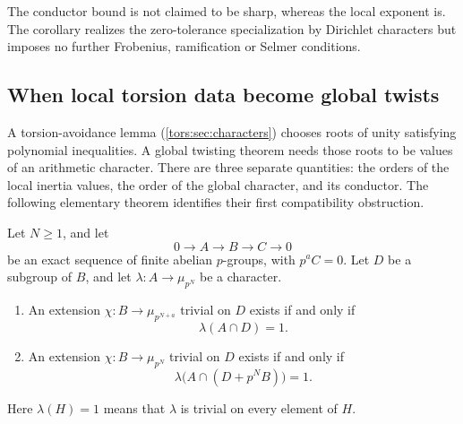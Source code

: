 The conductor bound is not claimed to be sharp, whereas the local exponent is. The
corollary realizes the zero-tolerance specialization by Dirichlet characters but imposes no
further Frobenius, ramification or Selmer conditions.

\subsection{When local torsion data become global twists}\label{spn:sec:characters}

A torsion-avoidance lemma (\cref{tors:sec:characters}) chooses roots of unity satisfying
polynomial inequalities. A global twisting theorem needs those roots to be
values of an arithmetic character. There are three separate quantities: the
orders of the local inertia values, the order of the global character, and
its conductor. The following elementary theorem identifies their first
compatibility obstruction.

\begin{theorem}\label{spn:thm:extension}
Let $N\ge1$, and let
\[
 0\longrightarrow A\longrightarrow B\longrightarrow C\longrightarrow0
\]
be an exact sequence of finite abelian $p$-groups, with $p^aC=0$. Let $D$ be
a subgroup of $B$, and let $\lambda\colon A\to\mu_{p^N}$ be a character.
\begin{enumerate}
\item An extension $\chi\colon B\to\mu_{p^{N+a}}$ trivial on $D$ exists if
and only if
\begin{equation}\label{spn:eq:compat-raised}
 \lambda(A\cap D)=1 .
\end{equation}
\item An extension $\chi\colon B\to\mu_{p^N}$ trivial on $D$ exists if and
only if
\begin{equation}\label{spn:eq:compat-exact}
 \lambda\bigl(A\cap(D+p^NB)\bigr)=1 .
\end{equation}
\end{enumerate}
Here $\lambda(H)=1$ means that $\lambda$ is trivial on every element of $H$.
\end{theorem}

